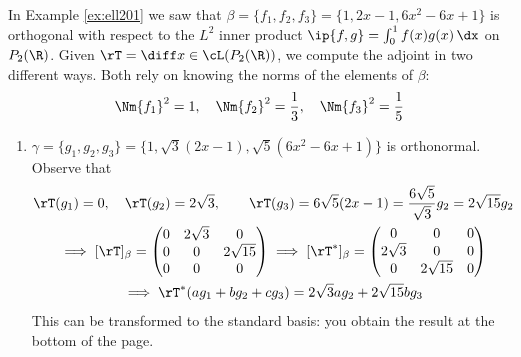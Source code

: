 \begin{example}{}{}
In Example \ref{ex:ell201} we saw that $\beta=\{f_1,f_2,f_3\}=\{1,2x-1,6x^2-6x+1\}$ is orthogonal with respect to the $L^2$ inner product $\ip{f,g}=\int_0^1f(x)g(x)\,\dx$ on $P_2(\R)$. Given $\rT=\diff x\in\cL(P_2(\R))$, we compute the adjoint in two different ways. Both rely on knowing the norms of the elements of $\beta$:
\[\Nm{f_1}^2=1,\quad \Nm{f_2}^2=\frac 13,\quad\Nm{f_3}^2=\frac 1{5}\]
\begin{enumerate}
  \item $\gamma=\{g_1,g_2,g_3\}=\{1,\sqrt{3}(2x-1),\sqrt{5}(6x^2-6x+1)\}$ is orthonormal. Observe that
  \begin{gather*}
  \rT(g_1)=0,\quad \rT(g_2)=2\sqrt 3,\qquad \rT(g_3)=6\sqrt 5(2x-1)=\frac{6\sqrt 5}{\sqrt 3}g_2=2\sqrt{15}g_2\\
  \implies [\rT]_\beta=\begin{pmatrix}
  0&2\sqrt 3&0\\
  0&0&2\sqrt{15}\\
  0&0&0
  \end{pmatrix} \implies
  [\rT^*]_\beta=\begin{pmatrix}
  0&0&0\\
  2\sqrt 3&0&0\\
  0&2\sqrt{15}&0
  \end{pmatrix}\\
  \implies \rT^*(ag_1+bg_2+cg_3)=2\sqrt 3ag_2+2\sqrt{15}bg_3
  \end{gather*}
  This can be transformed to the standard basis: you obtain the result at the bottom of the page.
  

\end{enumerate}
\end{example}
